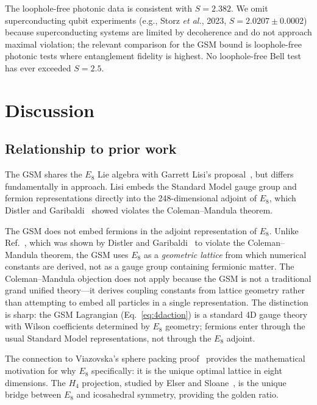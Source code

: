 \documentclass[aps,prd,twocolumn,superscriptaddress,nofootinbib,showpacs]{revtex4-2}
\begin{document}
The loophole-free photonic data is consistent with $S = 2.382$.
We omit superconducting qubit experiments (e.g., Storz \textit{et al.},
2023, $S = 2.0207 \pm 0.0002$) because superconducting systems are
limited by decoherence and do not approach maximal violation; the
relevant comparison for the GSM bound is loophole-free photonic tests
where entanglement fidelity is highest.  No loophole-free Bell test
has ever exceeded $S = 2.5$.

\section{Discussion}\label{sec:discussion}

\subsection{Relationship to prior work}\label{sec:priorwork}

The GSM shares the $E_8$ Lie algebra with Garrett Lisi's
proposal~\cite{Lisi2007}, but differs fundamentally in approach.  Lisi
embeds the Standard Model gauge group and fermion representations
directly into the 248-dimensional adjoint of $E_8$, which
Distler and Garibaldi~\cite{Distler2010} showed violates the
Coleman--Mandula theorem.

The GSM does not embed fermions in the adjoint representation of
$E_8$.  Unlike Ref.~\cite{Lisi2007}, which was shown by Distler and
Garibaldi~\cite{Distler2010} to violate the Coleman--Mandula theorem,
the GSM uses $E_8$ as a \emph{geometric lattice} from which numerical
constants are derived, not as a gauge group containing fermionic
matter.  The Coleman--Mandula objection does not apply because the GSM
is not a traditional grand unified theory---it derives coupling
constants from lattice geometry rather than attempting to embed all
particles in a single representation.  The distinction is sharp: the
GSM Lagrangian (Eq.~\ref{eq:4daction}) is a standard 4D gauge theory
with Wilson coefficients determined by $E_8$ geometry; fermions enter
through the usual Standard Model representations, not through the
$E_8$ adjoint.

The connection to Viazovska's sphere packing
proof~\cite{Viazovska2016} provides the mathematical motivation for
why $E_8$ specifically: it is the unique optimal lattice in eight
dimensions.  The $H_4$ projection, studied by Elser and
Sloane~\cite{ElserSloane}, is the unique bridge between $E_8$ and
icosahedral symmetry, providing the golden ratio.
\end{document}
